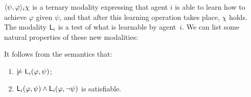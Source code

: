 $\langle \psi,\varphi \rangle_i\chi$ is a ternary modality expressing that agent $i$ is able to learn how to achieve $\varphi$ given $\psi$, and that after this learning operation takes place, $\chi$ holds.
The modality ${\sf L}_i$ is a test of what is learnable by  agent~$i$. 
We can list some natural properties of these new modalities:

\medskip

\begin{proposition}\label{prop:nolearn}
It follows from the semantics that:
\begin{enumerate}
\item\label{itm:nolearnable} $\not\models{\sf L}_i(\varphi,\psi)$; %
\item\label{itm:learnboth} ${\sf L}_i(\varphi,\psi) \wedge {\sf L}_i(\varphi,\neg\psi)$ is satisfiable.
\end{enumerate}
\end{proposition}


